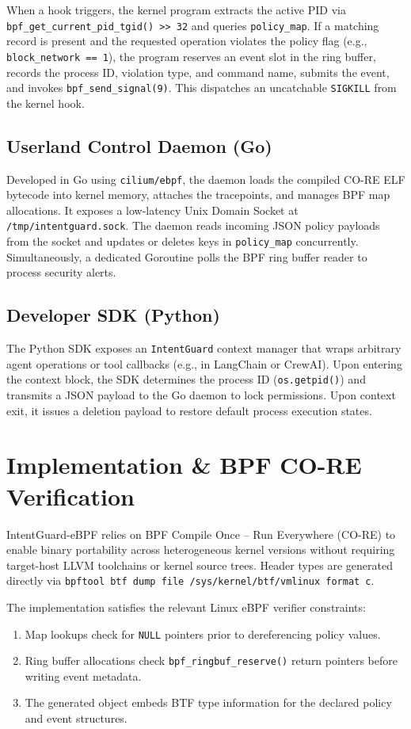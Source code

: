 \documentclass[conference]{IEEEtran}
\begin{document}
When a hook triggers, the kernel program extracts the active PID via \texttt{bpf\_get\_current\_pid\_tgid() >> 32} and queries \texttt{policy\_map}. If a matching record is present and the requested operation violates the policy flag (e.g., \texttt{block\_network == 1}), the program reserves an event slot in the ring buffer, records the process ID, violation type, and command name, submits the event, and invokes \texttt{bpf\_send\_signal(9)}. This dispatches an uncatchable \texttt{SIGKILL} from the kernel hook.

\subsection{Userland Control Daemon (Go)}
Developed in Go using \texttt{cilium/ebpf}, the daemon loads the compiled CO-RE ELF bytecode into kernel memory, attaches the tracepoints, and manages BPF map allocations. It exposes a low-latency Unix Domain Socket at \texttt{/tmp/intentguard.sock}. The daemon reads incoming JSON policy payloads from the socket and updates or deletes keys in \texttt{policy\_map} concurrently. Simultaneously, a dedicated Goroutine polls the BPF ring buffer reader to process security alerts.

\subsection{Developer SDK (Python)}
The Python SDK exposes an \texttt{IntentGuard} context manager that wraps arbitrary agent operations or tool callbacks (e.g., in LangChain or CrewAI). Upon entering the context block, the SDK determines the process ID (\texttt{os.getpid()}) and transmits a JSON payload to the Go daemon to lock permissions. Upon context exit, it issues a deletion payload to restore default process execution states.

\section{Implementation \& BPF CO-RE Verification}

IntentGuard-eBPF relies on BPF Compile Once -- Run Everywhere (CO-RE) to enable binary portability across heterogeneous kernel versions without requiring target-host LLVM toolchains or kernel source trees. Header types are generated directly via \texttt{bpftool btf dump file /sys/kernel/btf/vmlinux format c}.

The implementation satisfies the relevant Linux eBPF verifier constraints:
\begin{enumerate}
    \item Map lookups check for \texttt{NULL} pointers prior to dereferencing policy values.
    \item Ring buffer allocations check \texttt{bpf\_ringbuf\_reserve()} return pointers before writing event metadata.
    \item The generated object embeds BTF type information for the declared policy and event structures.
\end{enumerate}
\end{document}
